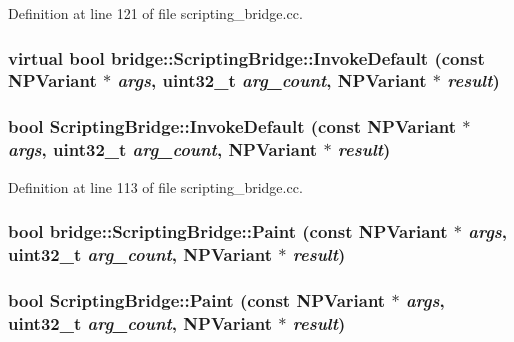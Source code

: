 Definition at line 121 of file scripting\_\-bridge.cc.

\hypertarget{classbridge_1_1_scripting_bridge_aec42e4cce5b1ff9187d98b88b07d11d3}{
\subsubsection[{InvokeDefault}]{\setlength{\rightskip}{0pt plus 5cm}virtual bool bridge::ScriptingBridge::InvokeDefault (const NPVariant $\ast$ {\em args}, \/  uint32\_\-t {\em arg\_\-count}, \/  NPVariant $\ast$ {\em result})}}
\label{classbridge_1_1_scripting_bridge_aec42e4cce5b1ff9187d98b88b07d11d3}
\hypertarget{classbridge_1_1_scripting_bridge_a2cee828951db15b4cce1074e934c4f97}{
\subsubsection[{InvokeDefault}]{\setlength{\rightskip}{0pt plus 5cm}bool ScriptingBridge::InvokeDefault (const NPVariant $\ast$ {\em args}, \/  uint32\_\-t {\em arg\_\-count}, \/  NPVariant $\ast$ {\em result})}}
\label{classbridge_1_1_scripting_bridge_a2cee828951db15b4cce1074e934c4f97}


Definition at line 113 of file scripting\_\-bridge.cc.

\hypertarget{classbridge_1_1_scripting_bridge_a44eeaa7c1de524f8df7f218c1b53233b}{
\subsubsection[{Paint}]{\setlength{\rightskip}{0pt plus 5cm}bool bridge::ScriptingBridge::Paint (const NPVariant $\ast$ {\em args}, \/  uint32\_\-t {\em arg\_\-count}, \/  NPVariant $\ast$ {\em result})}}
\label{classbridge_1_1_scripting_bridge_a44eeaa7c1de524f8df7f218c1b53233b}
\hypertarget{classbridge_1_1_scripting_bridge_abfdee6fdc6c4f0cc6007425a14e8384e}{
\subsubsection[{Paint}]{\setlength{\rightskip}{0pt plus 5cm}bool ScriptingBridge::Paint (const NPVariant $\ast$ {\em args}, \/  uint32\_\-t {\em arg\_\-count}, \/  NPVariant $\ast$ {\em result})}}
\label{classbridge_1_1_scripting_bridge_abfdee6fdc6c4f0cc6007425a14e8384e}


